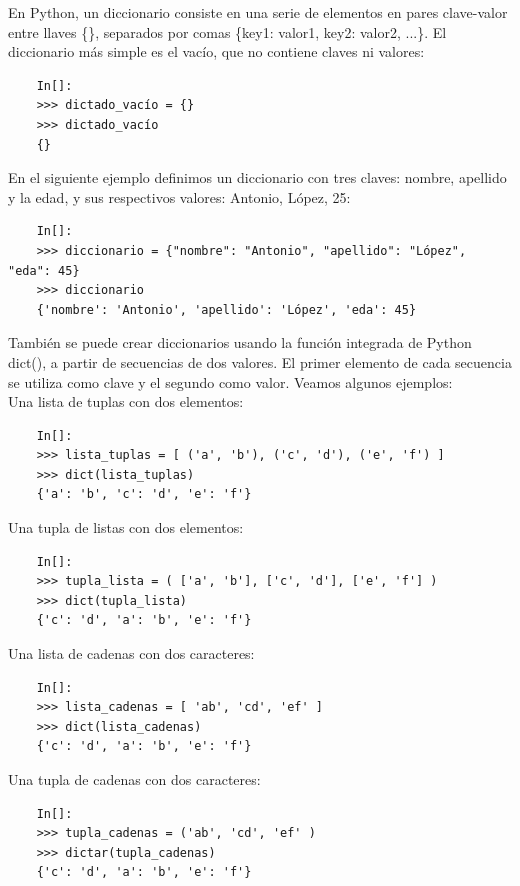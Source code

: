 En Python, un diccionario consiste en una serie de elementos en pares clave-valor entre llaves \{\}, separados por comas {\ttfamily \{key1: valor1, key2: valor2, ...\}}.  El diccionario más simple es el vacío, que no contiene claves ni valores:
\begin{lstlisting}
	In[]:		
	>>> dictado_vacío = {}
	>>> dictado_vacío
	{}	
\end{lstlisting}	

En el siguiente ejemplo definimos un diccionario con tres claves: nombre, apellido y la edad, y sus respectivos valores: Antonio, López, 25:

\begin{lstlisting}	
	In[]:		
	>>> diccionario = {"nombre": "Antonio", "apellido": "López", "eda": 45}
	>>> diccionario
	{'nombre': 'Antonio', 'apellido': 'López', 'eda': 45}
\end{lstlisting}


También se puede crear diccionarios usando la función integrada de Python {\ttfamily dict()},  a partir de  secuencias de dos valores. El primer elemento de cada secuencia se utiliza como clave y el
segundo como valor. Veamos algunos ejemplos: \\

Una lista de tuplas con dos elementos:

\begin{lstlisting}
	In[]:
	>>> lista_tuplas = [ ('a', 'b'), ('c', 'd'), ('e', 'f') ]
	>>> dict(lista_tuplas)
	{'a': 'b', 'c': 'd', 'e': 'f'}
\end{lstlisting}



Una tupla de listas con dos elementos:
\begin{lstlisting}
	In[]:
	>>> tupla_lista = ( ['a', 'b'], ['c', 'd'], ['e', 'f'] )
	>>> dict(tupla_lista)
	{'c': 'd', 'a': 'b', 'e': 'f'}
\end{lstlisting}

Una lista de cadenas con dos caracteres:
\begin{lstlisting}
	In[]:
	>>> lista_cadenas = [ 'ab', 'cd', 'ef' ]
	>>> dict(lista_cadenas)
	{'c': 'd', 'a': 'b', 'e': 'f'}
\end{lstlisting}

Una tupla de cadenas con dos caracteres:
\begin{lstlisting}
	In[]:
	>>> tupla_cadenas = ('ab', 'cd', 'ef' )
	>>> dictar(tupla_cadenas)
	{'c': 'd', 'a': 'b', 'e': 'f'}
\end{lstlisting}

